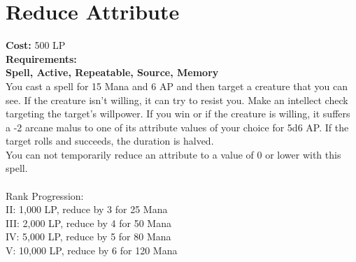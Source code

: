 \section{Reduce Attribute}\label{spell:reduceAbility}
\textbf{Cost:} 500 LP\\
\textbf{Requirements:}\\
\textbf{Spell, Active, Repeatable, Source, Memory}\\
You cast a spell for 15 Mana and 6 AP and then target a creature that you can see.
If the creature isn't willing, it can try to resist you.
Make an intellect check targeting the target's willpower.
If you win or if the creature is willing, it suffers a -2 arcane malus to one of its attribute values of your choice for 5d6 AP.
If the target rolls and succeeds, the duration is halved.\\
You can not temporarily reduce an attribute to a value of 0 or lower with this spell. \\
\\
Rank Progression:\\
II: 1,000 LP, reduce by 3 for 25 Mana\\
III: 2,000 LP, reduce by 4 for 50 Mana\\
IV: 5,000 LP, reduce by 5 for 80 Mana\\
V: 10,000 LP, reduce by 6 for 120 Mana\\